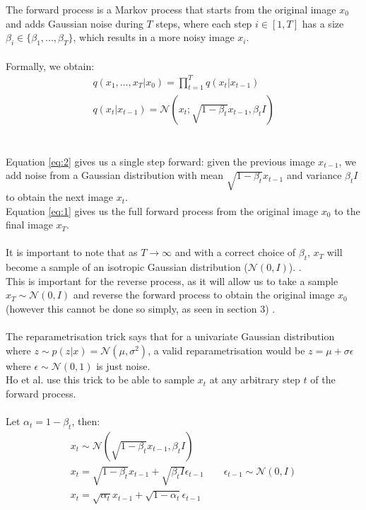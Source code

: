 \documentclass{article}
\begin{document}
The forward process is a Markov process that starts from the original image $x_0$ and adds Gaussian noise during $T$ steps, where each step $i \in [1, T]$ has a size $\beta_i \in \{ \beta_1, ..., \beta_T \}$, which results in a more noisy image $x_i$. \cite{ho2020denoising}
\\\\
Formally, we obtain:
\begin{gather}
  q(x_{1},..., x_{T} | x_0) = \prod_{t = 1}^T{q(x_t | x_{t - 1})} \label{eq:1} \\
  q(x_t | x_{t-1}) = \mathcal{N}(x_t; \sqrt{1 - \beta_t}x_{t-1}, \beta_t I) \label{eq:2}
\end{gather}
\\\\
Equation \ref{eq:2} gives us a single step forward: given the previous image $x_{t-1}$, we add noise from a Gaussian distribution with mean $\sqrt{1 - \beta_t}x_{t-1}$ and variance $\beta_t I$ to obtain the next image $x_t$. \\
Equation \ref{eq:1} gives us the full forward process from the original image $x_0$ to the final image $x_T$.
\\\\
It is important to note that as $T \rightarrow \infty$ and with a correct choice of $\beta_t$,  $x_T$ will become a sample of an isotropic Gaussian distribution ($\mathcal{N}(0, I)$). \cite{nichol2021improved} \cite{sohldickstein2015deep}. \\
This is important for the reverse process, as it will allow us to take a sample $x_T \sim \mathcal{N}(0, I)$ and reverse the forward process to obtain the original image $x_0$ (however this cannot be done so simply, as seen in section 3) \cite{nichol2021improved}.
\\\\
The reparametrisation trick says that for a univariate Gaussian distribution where $z \sim p(z | x) = \mathcal{N}(\mu, \sigma^2)$, a valid reparametrisation would be $z = \mu + \sigma \epsilon$ where $\epsilon \sim \mathcal{N}(0, 1)$ is just noise. \cite{kingma2022autoencoding} \\
Ho et al. \cite{ho2020denoising} use this trick to be able to sample $x_t$ at any arbitrary step $t$ of the forward process.
\\\\
Let $\alpha_t = 1 - \beta_t$, then:
\begin{gather*}
  x_t \sim \mathcal{N}(\sqrt{1 - \beta_t} x_{t-1}, \beta_t I) \\
  x_t = \sqrt{1 - \beta_t} x_{t-1} + \sqrt{\beta_t I} \epsilon_{t-1} \qquad \epsilon_{t - 1} \sim \mathcal{N}(0, I) \\
  x_t = \sqrt{\alpha_t} x_{t-1} + \sqrt{1 - \alpha_t} \epsilon_{t - 1}
\end{gather*}
\end{document}
